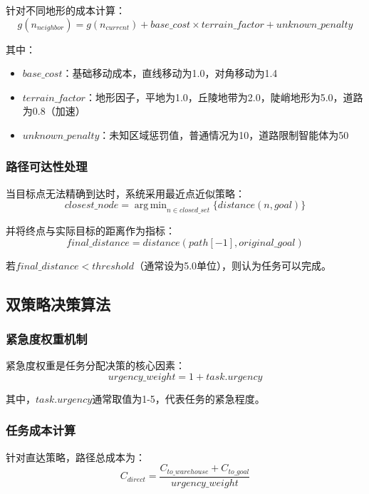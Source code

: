 \documentclass[12pt,a4paper]{article}
\DeclareMathOperator*{\argmin}{arg\,min}
\begin{document}
针对不同地形的成本计算：
\begin{equation}
g(n_{neighbor}) = g(n_{current}) + base\_cost \times terrain\_factor + unknown\_penalty
\end{equation}

其中：
\begin{itemize}
\item $base\_cost$：基础移动成本，直线移动为1.0，对角移动为1.4
\item $terrain\_factor$：地形因子，平地为1.0，丘陵地带为2.0，陡峭地形为5.0，道路为0.8（加速）
\item $unknown\_penalty$：未知区域惩罚值，普通情况为10，道路限制智能体为50
\end{itemize}

\subsubsection{路径可达性处理}
当目标点无法精确到达时，系统采用最近点近似策略：
\begin{equation}
closest\_node = \argmin_{n \in closed\_set} \{distance(n, goal)\}
\end{equation}

并将终点与实际目标的距离作为指标：
\begin{equation}
final\_distance = distance(path[-1], original\_goal)
\end{equation}

若$final\_distance < threshold$（通常设为5.0单位），则认为任务可以完成。

\subsection{双策略决策算法}

\subsubsection{紧急度权重机制}
紧急度权重是任务分配决策的核心因素：
\begin{equation}
urgency\_weight = 1 + task.urgency
\end{equation}

其中，$task.urgency$通常取值为1-5，代表任务的紧急程度。

\subsubsection{任务成本计算}
针对直达策略，路径总成本为：
\begin{equation}
C_{direct} = \frac{C_{to\_warehouse} + C_{to\_goal}}{urgency\_weight}
\end{equation}
\end{document}
